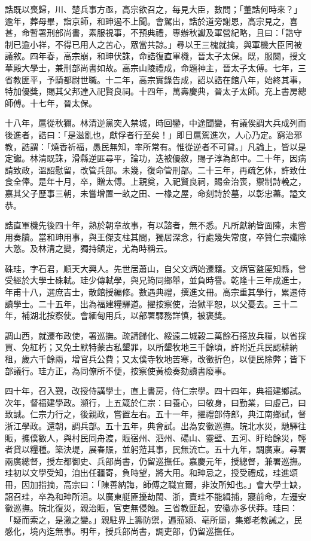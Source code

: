 \begin{pinyinscope}
誥既以喪歸，川、楚兵事方亟，高宗欲召之，每見大臣，數問；「董誥何時來？」逾年，葬母畢，詣京師，和珅遏不上聞。會駕出，誥於道旁謝恩，高宗見之，喜甚，命暫署刑部尚書，素服視事，不預典禮，專辦秋讞及軍營紀略，且曰：「誥守制已逾小祥，不得已用人之苦心，眾當共諒。」尋以王三槐就擒，與軍機大臣同被議敘。四年春，高宗崩，和珅伏誅，命誥復直軍機，晉太子太保。既，服闋，授文華殿大學士，兼刑部尚書如故。高宗山陵禮成，命題神主，晉太子太傅。七年，三省教匪平，予騎都尉世職。十二年，高宗實錄告成，詔以誥在館八年，始終其事，特加優獎，賜其父邦達入祀賢良祠。十四年，萬壽慶典，晉太子太師。充上書房總師傅。十七年，晉太保。

十八年，扈從秋獮。林清逆黨突入禁城，時回鑾，中途聞變，有議俟調大兵成列而後進者，誥曰：「是滋亂也，獻俘者行至矣！」即日扈駕進次，人心乃定。窮治邪教，誥謂：「燒香祈福，愚民無知，率所常有。惟從逆者不可貸。」凡論上，皆以是定讞。林清既誅，滑縣逆匪尋平，論功，迭被優敘，賜子淳為郎中。二十年，因病請致政，溫詔慰留，改管兵部。未幾，復命管刑部。二十三年，再疏乞休，許致仕食全俸。是年十月，卒，贈太傅。上親奠，入祀賢良祠，賜金治喪，禦制詩輓之，嘉其父子歷事三朝，未嘗增置一畝之田、一椽之屋，命刻詩於墓，以彰忠藎。謚文恭。

誥直軍機先後四十年，熟於朝章故事，有以諮者，無不悉。凡所獻納皆面陳，未嘗用奏牘。當和珅用事，與王傑支柱其間，獨居深念，行處幾失常度，卒贊仁宗殲除大憝。及林清之變，獨持鎮定，尤為時稱云。

硃珪，字石君，順天大興人。先世居蕭山，自父文炳始遷籍。文炳官盩厔知縣，曾受經於大學士硃軾。珪少傳軾學，與兄筠同鄉舉，並負時譽。乾隆十三年成進士，年甫十八，選庶吉士，散館授編修。數遇典禮，撰進文冊。高宗重其學行，累遷侍讀學士。二十五年，出為福建糧驛道。擢按察使，治獄平恕，以父憂去。三十二年，補湖北按察使。會緬甸用兵，以部署驛務詳慎，被褒獎。

調山西，就遷布政使，署巡撫。疏請歸化、綏遠二城穀二萬餘石搭放兵糧，以省採買、免紅朽；又免土默特蒙古私墾罪，以所墾牧地三千餘頃，許附近兵民認耕納租，歲六千餘兩，增官兵公費；又太僕寺牧地苦寒，改徵折色，以便民除弊；皆下部議行。珪方正，為同僚所不便，按察使黃檢奏劾讀書廢事。

四十年，召入覲，改授侍講學士，直上書房，侍仁宗學。四十四年，典福建鄉試。次年，督福建學政。瀕行，上五箴於仁宗：曰養心，曰敬身，曰勤業，曰虛己，曰致誠。仁宗力行之，後親政，嘗置左右。五十一年，擢禮部侍郎，典江南鄉試，督浙江學政。還朝，調兵部。五十五年，典會試。出為安徽巡撫。皖北水災，馳驛往賑，攜僕數人，與村民同舟渡，賑宿州、泗州、碭山、靈壁、五河、盱眙餘災，輕者貸以糧種。築決堤，展春賑，並躬蒞其事，民無流亡。五十九年，調廣東。尋署兩廣總督，授左都御史、兵部尚書，仍留巡撫任。嘉慶元年，授總督，兼署巡撫。珪初以文學受知，洎出任疆寄，負時望，將大用。和珅忌之，授受禮成，珪進頌冊，因加指摘，高宗曰：「陳善納誨，師傅之職宜爾，非汝所知也。」會大學士缺，詔召珪，卒為和珅所沮。以廣東艇匪擾劫閩、浙，責珪不能緝捕，寢前命，左遷安徽巡撫。皖北復災，親治賑，官吏無侵蝕。三省教匪起，安徽亦多伏莽。珪曰：「疑而索之，是激之變。」親駐界上籌防禦，遍蒞潁、亳所屬，集鄉老教誡之，民感化，境內迄無事。明年，授兵部尚書，調吏部，仍留巡撫任。


\end{pinyinscope}
